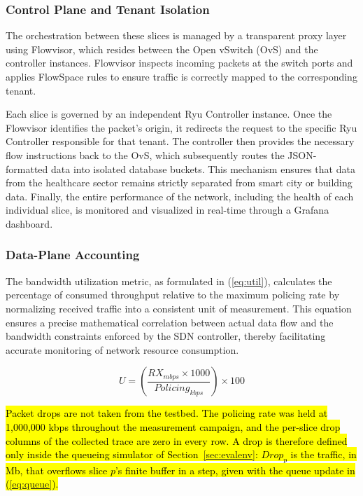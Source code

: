 \documentclass[conference]{IEEEtran}
\newcommand{\rev}[1]{\hl{#1}}
\newcommand{\m}[1]{\mbox{$#1$}}
\begin{document}
\subsubsection{Control Plane and Tenant Isolation}

The orchestration between these slices is managed by a transparent proxy layer using Flowvisor, which resides between the Open vSwitch (OvS) and the controller instances. Flowvisor inspects incoming packets at the switch ports and applies FlowSpace rules to ensure traffic is correctly mapped to the corresponding tenant.

Each slice is governed by an independent Ryu Controller instance. Once the Flowvisor identifies the packet's origin, it redirects the request to the specific Ryu Controller responsible for that tenant. The controller then provides the necessary flow instructions back to the OvS, which subsequently routes the JSON-formatted data into isolated database buckets. This mechanism ensures that data from the healthcare sector remains strictly separated from smart city or building data. Finally, the entire performance of the network, including the health of each individual slice, is monitored and visualized in real-time through a Grafana dashboard.

\subsubsection{Data-Plane Accounting}

The bandwidth utilization metric, as formulated in (\ref{eq:util}), calculates the percentage of consumed throughput relative to the maximum policing rate by normalizing received traffic into a consistent unit of measurement. This equation ensures a precise mathematical correlation between actual data flow and the bandwidth constraints enforced by the SDN controller, thereby facilitating accurate monitoring of network resource consumption.

\begin{equation}\label{eq:util}
U = \left( \frac{RX_{mbps} \times 1000}{Policing_{kbps}} \right) \times 100
\end{equation}

\rev{Packet drops are not taken from the testbed. The policing rate was held at 1,000,000 kbps throughout the measurement campaign, and the per-slice drop columns of the collected trace are zero in every row. A drop is therefore defined only inside the queueing simulator of Section~\ref{sec:evalenv}: \m{Drop_p} is the traffic, in Mb, that overflows slice \m{p}'s finite buffer in a step, given with the queue update in (\ref{eq:queue}).}
\end{document}
